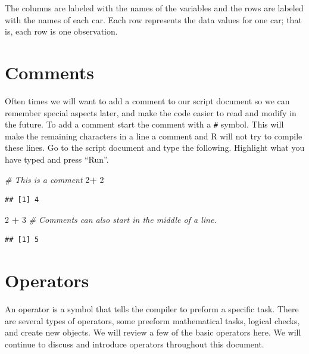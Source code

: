 \documentclass[
]{book}
\newenvironment{Shaded}{\begin{snugshade}}{\end{snugshade}}
\newcommand{\CommentTok}[1]{\textcolor[rgb]{0.56,0.35,0.01}{\textit{#1}}}
\newcommand{\DecValTok}[1]{\textcolor[rgb]{0.00,0.00,0.81}{#1}}
\newcommand{\OperatorTok}[1]{\textcolor[rgb]{0.81,0.36,0.00}{\textbf{#1}}}
\newcommand{\StringTok}[1]{\textcolor[rgb]{0.31,0.60,0.02}{#1}}
\begin{document}
The columns are labeled with the names of the variables and the rows are labeled with the names of each car. Each row represents the data values for one car; that is, each row is one observation.

\hypertarget{comments}{%
\section{Comments}\label{comments}}

Often times we will want to add a comment to our script document so we can remember special aspects later, and make the code easier to read and modify in the future. To add a comment start the comment with a \texttt{\#} symbol. This will make the remaining characters in a line a comment and R will not try to compile these lines. Go to the script document and type the following. Highlight what you have typed and press ``Run''.

\begin{Shaded}
\begin{Highlighting}[]
\CommentTok{# This is a comment }
\DecValTok{2}\OperatorTok{+}\StringTok{ }\DecValTok{2}
\end{Highlighting}
\end{Shaded}

\begin{verbatim}
## [1] 4
\end{verbatim}

\begin{Shaded}
\begin{Highlighting}[]
\DecValTok{2} \OperatorTok{+}\StringTok{ }\DecValTok{3} \CommentTok{# Comments can also start in the middle of a line. }
\end{Highlighting}
\end{Shaded}

\begin{verbatim}
## [1] 5
\end{verbatim}

\hypertarget{operators}{%
\section{Operators}\label{operators}}

An operator is a symbol that tells the compiler to preform a specific task. There are several types of operators, some preeform mathematical tasks, logical checks, and create new objects. We will review a few of the basic operators here. We will continue to discuss and introduce operators throughout this document.
\end{document}
